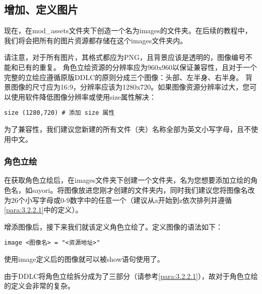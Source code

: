 \subsection{增加、定义图片}

现在，在mod\_assets文件夹下创造一个名为images的文件夹。在后续的教程中，我们将会把所有的图片资源都存储在这个images文件夹内。

\begin{Warning}
请注意，对于所有图片，其格式都应为PNG，且背景应该是透明的，图像编号不能和已有的重复。
角色立绘资源的分辨率应为960x960以保证兼容性，且对于一个完整的立绘应遵循原版DDLC的原则分成三个图像：头部、左半身、右半身。
背景图像的尺寸应为16:9，分辨率应该为1280x720。如果图像资源分辨率过大，您可以使用软件降低图像分辨率或使用size属性解决：
\begin{lstlisting}
size (1280,720) # 添加 size 属性
\end{lstlisting}

为了兼容性，我们建议您新建的所有文件（夹）名称全部为英文小写字母，且不使用中文。
\end{Warning}

\subsubsection{角色立绘}

在获取角色立绘后，在images文件夹下创建一个文件夹，名为您想要添加立绘的角色名，如sayori。将图像放进您刚才创建的文件夹内，同时我们建议您将图像名改为26个小写字母或0-9数字中的任意一个（建议从a开始到z依次排列并遵循\ref{para:3.2.2.1}中的定义）。

增添图像后，接下来我们就该定义角色立绘了。定义图像的语法如下：

\begin{lstlisting}
image <图像名> = "<资源地址>"
\end{lstlisting}

使用image定义后的图像就可以被show语句使用了。


由于DDLC将角色立绘拆分成为了三部分（请参考\ref{para:3.2.2.1}），故对于角色立绘的定义会非常的复杂。

